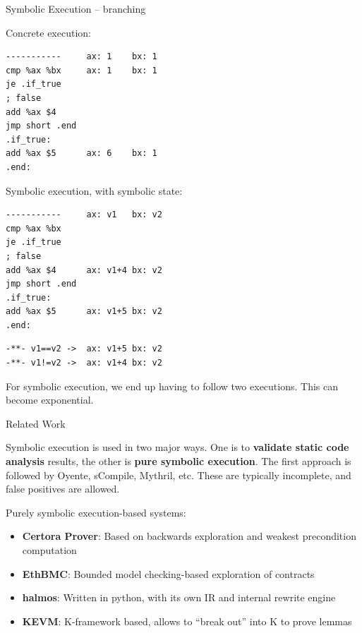 \documentclass[aspectratio=169]{beamer}
\begin{document}
\begin{frame}[fragile=singleslide]{Symbolic Execution -- branching}
\begin{minipage}[t]{0.45\textwidth}
Concrete execution:
\begin{Verbatim}[fontsize=\small]
-----------     ax: 1    bx: 1
cmp %ax %bx     ax: 1    bx: 1
je .if_true     
; false
add %ax $4
jmp short .end
.if_true:
add %ax $5      ax: 6    bx: 1
.end:
\end{Verbatim}
\end{minipage}%
\begin{minipage}[t]{0.45\textwidth}
Symbolic execution, with symbolic state:
\begin{Verbatim}[fontsize=\small]
-----------     ax: v1   bx: v2
cmp %ax %bx     
je .if_true     
; false
add %ax $4      ax: v1+4 bx: v2
jmp short .end
.if_true:
add %ax $5      ax: v1+5 bx: v2
.end:
\end{Verbatim}
\begin{Verbatim}[fontsize=\small]
-**- v1==v2 ->  ax: v1+5 bx: v2
-**- v1!=v2 ->  ax: v1+4 bx: v2
\end{Verbatim}
\end{minipage}
\bigskip

For symbolic execution, we end up having to follow two executions. This can become exponential.
\end{frame}


\begin{frame}{Related Work}

Symbolic execution is used in two major ways. One is to \textbf{validate static code analysis} results, the other is \textbf{pure symbolic execution}. The first approach is followed by Oyente, sCompile, Mythril, etc. These are typically incomplete, and false positives are allowed.

\bigskip

Purely symbolic execution-based systems:
\begin{itemize}
\item \textbf{Certora Prover}: Based on backwards exploration and weakest precondition computation
\item \textbf{EthBMC}: Bounded model checking-based exploration of contracts
\item \textbf{halmos}: Written in python, with its own IR and internal rewrite engine
\item \textbf{KEVM}: K-framework based, allows to ``break out'' into K to prove lemmas
\end{itemize}
\end{frame}
\end{document}
